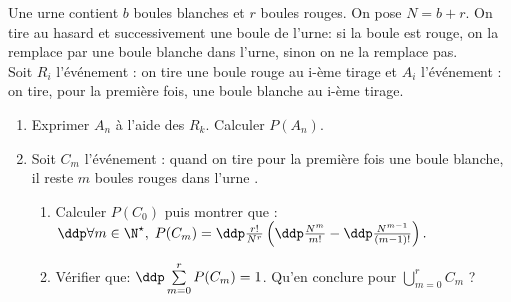 



\begin{exercice}   \;
Une urne contient $b$ boules blanches et $r$ boules rouges. On pose $N=b+r$. On tire au hasard et successivement une boule de l'urne: si la boule est rouge, on la remplace par une boule blanche dans l'urne, sinon on ne la remplace pas.\\
\noindent Soit $R_i$ l'\'ev\'enement : \og on tire une boule rouge au i-\`eme tirage\fg \;  et $A_i$ l'\'ev\'enement : \og on tire, pour la premi\`ere fois, une boule blanche au i-\`eme tirage\fg.
\begin{enumerate}
 \item Exprimer $A_n$ \`a l'aide des $R_k$. Calculer $P(A_n)$.
\item Soit $C_m$ l'\'ev\'enement : \og quand on tire pour la premi\`ere fois une boule blanche, il reste $m$ boules rouges dans l'urne \fg.
\begin{enumerate}
\item Calculer $P(C_0)$ puis montrer que : $\ddp \forall m\in\N^{\star},\; P(C_m)=\ddp\frac{r!}{N^r}\left( \ddp\frac{N^m}{m!}-\ddp\frac{N^{m-1}}{(m-1)!} \right).$
\item V\'erifier que: $\ddp \sum\limits_{m=0}^r P(C_m)=1$. Qu'en conclure pour $\bigcup\limits_{m=0}^r C_m$ ?
\end{enumerate}
\end{enumerate}
\end{exercice}


